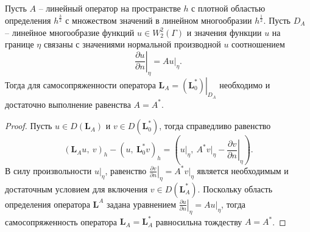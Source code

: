 \begin{theorem}
Пусть $A$ -- линейный оператор на пространстве $h$ с плотной областью определения $h^\frac{3}{2}$ с множеством значений в линейном многообразии $h^\frac{1}{2}$. Пусть $D_A$ -- линейное многообразие функций $u \in W_2^2(\Gamma)$ и значения функции $u$ на границе $\eta$ связаны с значениями нормальной производной $u$ соотношением 
$$\left. \frac{\partial u}{\partial n} \right|_\eta = A \left. u \right|_\eta.$$
Тогда для самосопряженности оператора $\mathbf{L}_A = \left. ( \mathbf{L}_0^* ) \right|_{D_A}$ необходимо и достаточно выполнение равенства $A=A^*$.
\end{theorem}
\begin{proof}
Пусть $ u \in D(\mathbf{L}_A)$ и $ v \in D(\mathbf{L}_0^*)$, тогда справедливо равенство
$$\left( \mathbf{L}_A u , \ v \right)_h - \left(  u , \  \mathbf{L}_0^* v \right)_h  = 
\left( 
\left. u \right|_\eta , \ A^* \left. v \right|_\eta - \left. \frac{\partial v}{\partial n} \right|_\eta 
\right).$$
В силу произвольности  $\left. u \right|_\eta$, равенство $\left. \frac{\partial v}{\partial n} \right|_\eta = A^* \left. v \right|_\eta$ является необходимым и достаточным условием для включения $v \in D(\mathbf{L}_A^*)$. Поскольку область определения оператора $\mathbf{L}^A$ задана уравнением $\left. \frac{\partial u}{\partial n} \right|_\eta = A \left. u \right|_\eta$, тогда самосопряженность оператора $\mathbf{L}_A = \mathbf{L}_A^*$ равносильна тождеству $A=A^*$.
\end{proof}

